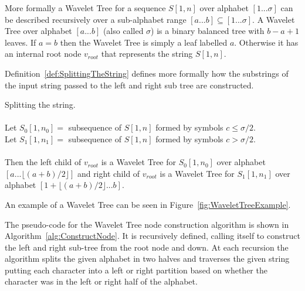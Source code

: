 More formally a Wavelet Tree for a sequence $S[1,n]$ over alphabet $[1 ... \sigma]$ can be described recursively over a sub-alphabet range $[a ... b] \subseteq [1 ... \sigma]$.
A Wavelet Tree over alphabet $[a ... b]$ (also called $\sigma$) is a binary balanced tree with $b - a + 1$ leaves. If $a = b$ then the Wavelet Tree is simply a leaf labelled $a$. 
Otherwise it has an internal root node $v_{root}$ that represents the string $S[1,n]$. 

Definition~\ref{def:SplittingTheString} defines more formally how the substrings of the input string passed to the left and right sub tree are constructed.


\vspace{0.5 cm}
\begin{mdframed}[nobreak, linecolor=lightgray, linewidth=2pt]
\begin{definition} Splitting the string. \\\\
Let $S_0[1,n_0] =$ subsequence of $S[1,n]$ formed by symbols $c \leq \sigma/2$.\\
Let $S_1[1,n_1] =$ subsequence of $S[1,n]$ formed by symbols $c > \sigma/2$.\\\\
Then the left child of $v_{root}$ is a Wavelet Tree for $S_0[1,n_0]$ over alphabet $[a ... \lfloor (a + b)/2 \rfloor]$ and right child of $v_{root}$ is a Wavelet Tree for $S_1[1,n_1]$ over alphabet $[1 + \lfloor (a + b)/2 \rfloor ... b]$.
\label{def:SplittingTheString}
\end{definition}
\end{mdframed}
\vspace{0.5 cm}

\noindent An example of a Wavelet Tree can be seen in Figure~\ref{fig:WaveletTreeExample}.
 
The pseudo-code for the Wavelet Tree node construction algorithm is shown in Algorithm~\ref{alg:ConstructNode}. 
It is recursively defined, calling itself to construct the left and right sub-tree from the root node and down. At each recursion the algorithm splits the given alphabet in two halves and traverses the given string putting each character into a left or right partition based on whether the character was in the left or right half of the alphabet.

